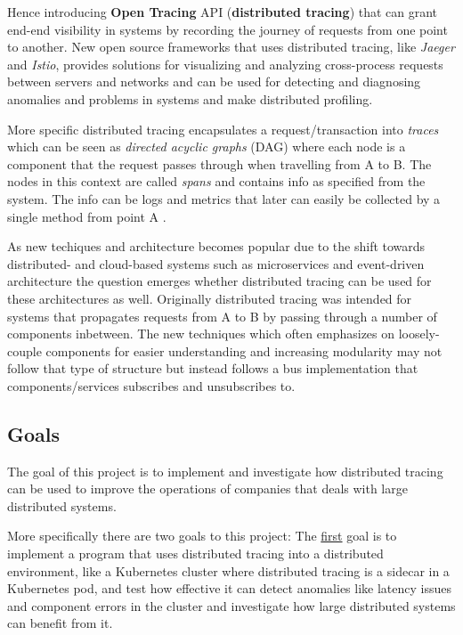 \documentclass[10pt, titlepage, oneside, a4paper]{article}
\begin{document}
Hence introducing \textbf{Open Tracing} API (\textbf{distributed tracing}) that can grant end-end visibility in systems by recording the journey of requests from one point to another. New open source frameworks that uses distributed tracing, like \textit{Jaeger} and \textit{Istio}, provides solutions for visualizing and analyzing cross-process requests between servers and networks and can be used for detecting and diagnosing anomalies and problems in systems and make distributed profiling. 

More specific distributed tracing encapsulates a request/transaction into \textit{traces} which can be seen as \textit{directed acyclic graphs} (DAG) where each node is a component that the request passes through when travelling from A to B. The nodes in this context are called \textit{spans} and contains info as specified from the system. The info can be logs and metrics that later can easily be collected by a single method from point A \cite{wp}\cite{ot}. 


As new techiques and architecture becomes popular due to the shift towards distributed- and cloud-based systems such as microservices and event-driven architecture the question emerges whether distributed tracing can be used for these architectures as well. Originally distributed tracing was intended for systems that propagates requests from A to B by passing through a number of components inbetween. The new techniques which often emphasizes on loosely-couple components for easier understanding and increasing modularity may not follow that type of structure but instead follows a bus implementation that components/services subscribes and unsubscribes to.  


\subsection{Goals}
The goal of this project is to implement and investigate how distributed tracing can be used to improve the operations of companies that deals with large distributed systems.

More specifically there are two goals to this project: The \underline{first} goal is to implement a program that uses distributed tracing into a distributed environment, like a Kubernetes cluster where distributed tracing is a sidecar in a Kubernetes pod, and test how effective it can detect anomalies like latency issues and component errors in the cluster and investigate how large distributed systems can benefit from it.
\end{document}
